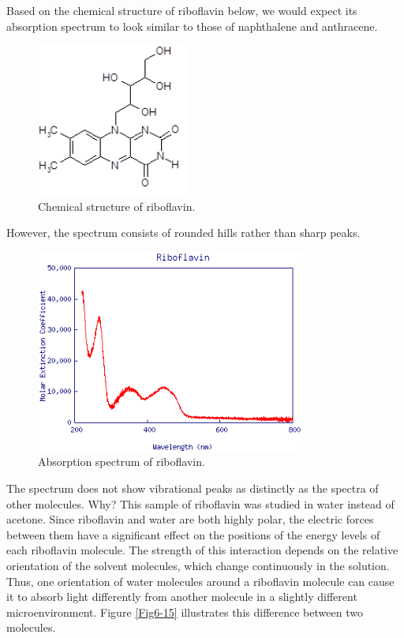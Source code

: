 Based on the chemical structure of riboflavin below, we would expect its absorption spectrum to look similar to those of naphthalene and anthracene.
\begin{figure}[h]
	\centering
	\includegraphics[width=2.0in]{./figures/Topic6/Fig6-13.png}
	\caption{Chemical structure of riboflavin.}
	\label{Fig6-13}
\end{figure}   
However, the spectrum consists of rounded hills rather than sharp peaks.
\begin{figure}[h]
	\centering
	\includegraphics[width=3.5in]{./figures/Topic6/Fig6-14.png}
	\caption{Absorption spectrum of riboflavin.}
	\label{Fig6-14}
\end{figure} 
The spectrum does not show vibrational peaks as distinctly as the spectra of other molecules.  Why?  This sample of riboflavin was studied in water instead of acetone.  Since riboflavin and water are both highly polar, the electric forces between them have a significant effect on the positions of the energy levels of each riboflavin molecule.  The strength of this interaction depends on the relative orientation of the solvent molecules, which change continuously in the solution.  Thus, one orientation of water molecules around a riboflavin molecule can cause it to absorb light differently from another molecule in a slightly different microenvironment.  Figure \ref{Fig6-15} illustrates this difference between two molecules.
